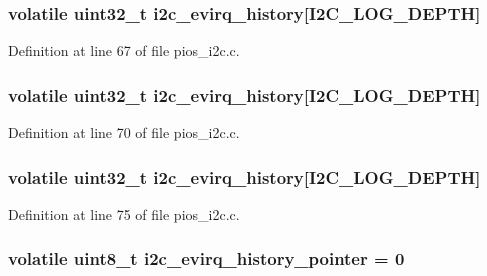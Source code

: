 \hypertarget{group___p_i_o_s___i2_c_ga958ee525a13dda424039275af66ad3ce}{
\subsubsection[{i2c\-\_\-evirq\-\_\-history}]{\setlength{\rightskip}{0pt plus 5cm}volatile uint32\-\_\-t {\bf i2c\-\_\-evirq\-\_\-history}\mbox{[}\-I2\-C\-\_\-\-L\-O\-G\-\_\-\-D\-E\-P\-T\-H\mbox{]}}}\label{group___p_i_o_s___i2_c_ga958ee525a13dda424039275af66ad3ce}


\-Definition at line 67 of file pios\-\_\-i2c.\-c.

\hypertarget{group___p_i_o_s___i2_c_ga958ee525a13dda424039275af66ad3ce}{
\subsubsection[{i2c\-\_\-evirq\-\_\-history}]{\setlength{\rightskip}{0pt plus 5cm}volatile uint32\-\_\-t {\bf i2c\-\_\-evirq\-\_\-history}\mbox{[}\-I2\-C\-\_\-\-L\-O\-G\-\_\-\-D\-E\-P\-T\-H\mbox{]}}}\label{group___p_i_o_s___i2_c_ga958ee525a13dda424039275af66ad3ce}


\-Definition at line 70 of file pios\-\_\-i2c.\-c.

\hypertarget{group___p_i_o_s___i2_c_ga958ee525a13dda424039275af66ad3ce}{
\subsubsection[{i2c\-\_\-evirq\-\_\-history}]{\setlength{\rightskip}{0pt plus 5cm}volatile uint32\-\_\-t {\bf i2c\-\_\-evirq\-\_\-history}\mbox{[}\-I2\-C\-\_\-\-L\-O\-G\-\_\-\-D\-E\-P\-T\-H\mbox{]}}}\label{group___p_i_o_s___i2_c_ga958ee525a13dda424039275af66ad3ce}


\-Definition at line 75 of file pios\-\_\-i2c.\-c.

\hypertarget{group___p_i_o_s___i2_c_gadf5676851d3bae320be666713dd5cb95}{
\subsubsection[{i2c\-\_\-evirq\-\_\-history\-\_\-pointer}]{\setlength{\rightskip}{0pt plus 5cm}volatile uint8\-\_\-t {\bf i2c\-\_\-evirq\-\_\-history\-\_\-pointer} = 0}}\label{group___p_i_o_s___i2_c_gadf5676851d3bae320be666713dd5cb95}


